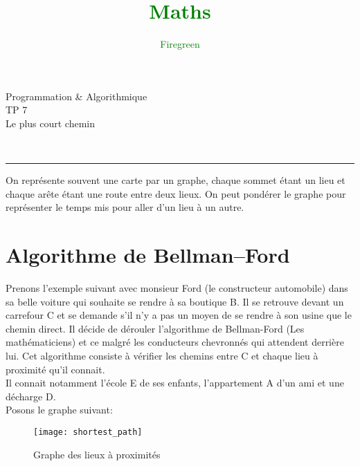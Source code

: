 \documentclass[11pt]{extarticle}
\author{\textcolor{Green}{Firegreen}}
\title{\textcolor{Green}{\textbf{Maths}}}
\begin{document}
\begin{minipage}[t]{0.3\paperwidth}
\begin{flushleft}
\end{flushleft}
\end{minipage}
\begin{minipage}[t]{0.4\paperwidth}
\begin{flushright}
\noindent \Huge{Programmation \& Algorithmique} \\
\noindent \LARGE{TP 7} \\
\noindent \Large{Le plus court chemin}
\end{flushright}
\end{minipage}\\
\begin{center}
\rule{\textwidth}{0.2cm}
\end{center}
On représente souvent une carte par un graphe, chaque sommet étant un lieu et chaque arête étant une route entre deux lieux. On peut pondérer le graphe pour représenter le temps mis pour aller d'un lieu à un autre.

\section{Algorithme de Bellman–Ford}
Prenons l'exemple suivant avec monsieur Ford (le constructeur automobile) dans sa belle voiture qui souhaite se rendre à sa boutique B. Il se retrouve devant un carrefour C et se demande s'il n'y a pas un moyen de se rendre à son usine que le chemin direct. Il décide de dérouler l'algorithme de Bellman-Ford (Les mathématiciens) et ce malgré les conducteurs chevronnés qui attendent derrière lui. Cet algorithme consiste à vérifier les chemins entre C et chaque lieu à proximité qu'il connait.\\
Il connait notamment l'école E de ses enfants, l'appartement A d'un ami et une décharge D.\\
Posons le graphe suivant:\\
\begin{figure}[H]
\begin{center}
\texttt{[image: shortest\_path]}
\caption{Graphe des lieux à proximités}
\end{center}
\end{figure}
\newpage
\end{document}
